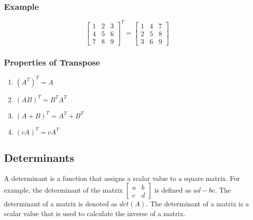 \documentclass[titlepage,a4paper]{article}
\begin{document}
		\subsubsection{Example}
			\begin{equation*}
				\left[
				\begin{matrix}
					1 & 2 & 3 \\
					4 & 5 & 6 \\
					7 & 8 & 9
				\end{matrix}
				\right]^{T}
				=
				\left[
				\begin{matrix}
					1 & 4 & 7 \\
					2 & 5 & 8 \\
					3 & 6 & 9
				\end{matrix}
				\right]
			\end{equation*}
			\subsubsection{Properties of Transpose}
				\begin{enumerate}
					\item $(A^T)^T = A$
					\item $(AB)^T = B^TA^T$
					\item $(A+B)^T = A^T + B^T$
					\item $(cA)^T = cA^T$
				\end{enumerate}
	\subsection{Determinants}
		A determinant is a function that assigns a scalar value to a square matrix.
		For example, the determinant of the matrix
		$
			\left[
				\begin{matrix}
					a & b \\
					c & d
				\end{matrix}
			\right]
		$
		is defined as $ad-bc$. The determinant of a matrix is denoted as $det(A)$. The determinant of a matrix is a scalar value that is used to calculate the inverse of a matrix. 
\end{document}
